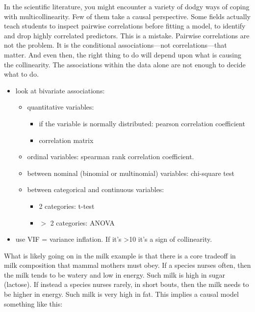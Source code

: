 \documentclass[
]{article}
\providecommand{\tightlist}{%
  \setlength{\itemsep}{0pt}\setlength{\parskip}{0pt}}
\begin{document}
In the scientific literature, you might encounter a variety of dodgy
ways of coping with multicollinearity. Few of them take a causal
perspective. Some fields actually teach students to inspect pairwise
correlations before fitting a model, to identify and drop highly
correlated predictors. This is a mistake. Pairwise correlations are not
the problem. It is the conditional associations---not
correlations---that matter. And even then, the right thing to do will
depend upon what is causing the collinearity. The associations within
the data alone are not enough to decide what to do.

\begin{itemize}
\item
  look at bivariate associations:

  \begin{itemize}
  \item
    quantitative variables:

    \begin{itemize}
    \tightlist
    \item
      if the variable is normally distributed: pearson correlation
      coefficient
    \item
      correlation matrix
    \end{itemize}
  \item
    ordinal variables: spearman rank correlation coefficient.
  \item
    between nominal (binomial or multinomial) variables: chi-square test
  \item
    between categorical and continuous variables:

    \begin{itemize}
    \tightlist
    \item
      2 categories: t-test
    \item
      \(>\) 2 categories: ANOVA
    \end{itemize}
  \end{itemize}
\item
  use VIF = variance inflation. If it's \textgreater10 it's a sign of
  collinearity.
\end{itemize}

What is likely going on in the milk example is that there is a core
tradeoff in milk composition that mammal mothers must obey. If a species
nurses often, then the milk tends to be watery and low in energy. Such
milk is high in sugar (lactose). If instead a species nurses rarely, in
short bouts, then the milk needs to be higher in energy. Such milk is
very high in fat. This implies a causal model something like this:
\end{document}
